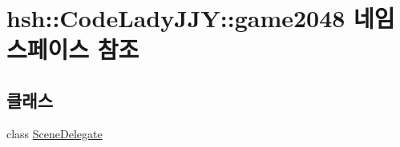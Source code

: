 \hypertarget{namespacehsh_1_1_code_lady_j_j_y_1_1game2048}{}\section{hsh\+:\+:Code\+Lady\+J\+JY\+:\+:game2048 네임스페이스 참조}
\label{namespacehsh_1_1_code_lady_j_j_y_1_1game2048}
\subsection*{클래스}
\begin{DoxyCompactItemize}
\item 
class \hyperlink{classhsh_1_1_code_lady_j_j_y_1_1game2048_1_1_scene_delegate}{Scene\+Delegate}
\end{DoxyCompactItemize}
